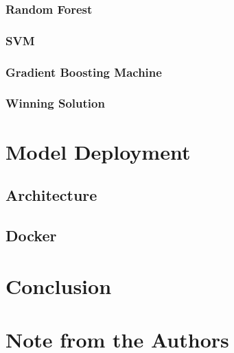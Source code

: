 \hypertarget{random-forest-1}{%
\subsubsection{Random Forest}\label{random-forest-1}}

\hypertarget{svm-1}{%
\subsubsection{SVM}\label{svm-1}}

\hypertarget{gradient-boosting-machine-1}{%
\subsubsection{Gradient Boosting
Machine}\label{gradient-boosting-machine-1}}

\hypertarget{winning-solution-1}{%
\subsubsection{Winning Solution}\label{winning-solution-1}}

\hypertarget{model-deployment}{%
\section{Model Deployment}\label{model-deployment}}

\hypertarget{architecture}{%
\subsection{Architecture}\label{architecture}}

\hypertarget{docker}{%
\subsection{Docker}\label{docker}}

\hypertarget{conclusion}{%
\section{Conclusion}\label{conclusion}}



\hypertarget{note-from-the-authors}{%
\section{Note from the Authors}\label{note-from-the-authors}}

